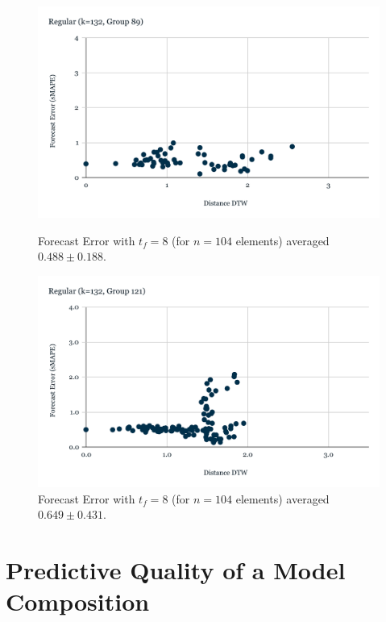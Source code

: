 \begin{figure}[!htbp]
  \centering
  \begin{minipage}[b]{0.45\textwidth}
    \includegraphics[width=\textwidth]{../Figures/distDTW_ForecastError_r132_c89}
    \caption{Forecast Error with $t_{f}=8$ (for $n=104$ elements) averaged $0.488 \pm 0.188$.}
    \label{Fig:DTWsMAPE_r132_c89}
  \end{minipage}
  \hfill
  \begin{minipage}[b]{0.45\textwidth}
    \includegraphics[width=\textwidth]{../Figures/distDTW_ForecastError_r132_c121}
    \caption{Forecast Error with $t_{f}=8$ (for $n=104$ elements) averaged $0.649 \pm 0.431$.}
    \label{Fig:DTWsMAPE_r132_c121}
  \end{minipage}
\end{figure}

\section{Predictive Quality of a Model Composition}
\label{Sec:MedoidsModelComposition}

